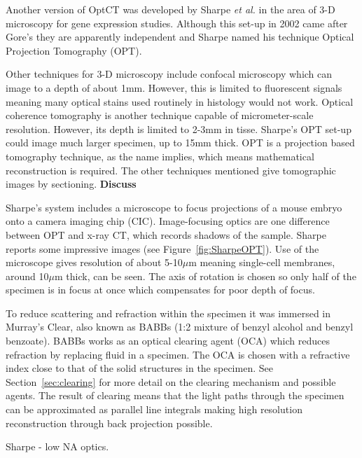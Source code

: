 \documentclass[12pt]{article}
\begin{document}
Another version of OptCT was  developed by Sharpe \textit{et al.} in the area of 3-D microscopy for gene expression studies. \cite{Sharpe:2002jp} Although this set-up in 2002 came after Gore's they are apparently independent and Sharpe named his technique Optical Projection Tomography (OPT).

Other techniques for 3-D microscopy include confocal microscopy which can image to a depth of about 1mm. \cite{Webb:1996} However, this is limited to fluorescent signals meaning many optical stains used routinely in histology would not work. Optical coherence tomography is another technique capable of micrometer-scale resolution. \cite{huang1993optical} However, its depth is limited to 2-3mm in tisse. Sharpe's OPT set-up could image much larger specimen, up to 15mm thick.  \cite{Sharpe:2002jp} OPT is a projection based tomography technique, as the name implies, which means mathematical reconstruction is required. The other techniques mentioned give tomographic images by sectioning. \cite{Sharpe:2003cm} \textbf{Discuss}

Sharpe's system includes a microscope to focus projections of a mouse embryo onto a camera imaging chip (CIC). Image-focusing optics are one difference between OPT and x-ray CT, which records shadows of the sample. Sharpe reports some impressive images (see Figure~\ref{fig:SharpeOPT}). Use of the microscope gives resolution of about 5-10$\mu$m meaning single-cell membranes, around 10$\mu$m thick, can be seen.\cite{Sharpe:2002jp} The axis of rotation is chosen so only half of the specimen is in focus at once which compensates for poor depth of focus. 

To reduce scattering and refraction within the specimen it was immersed in Murray's Clear, also known as BABBs (1:2 mixture of benzyl alcohol and benzyl benzoate). BABBs works as an optical clearing agent (OCA) which reduces refraction by replacing fluid in a specimen. The OCA is chosen with a refractive index close to that of the solid structures in the specimen. See Section~\ref{sec:clearing} for more detail on the clearing mechanism and possible agents. 
The result of clearing means that the light paths through the specimen can be approximated as parallel line integrals  making high resolution reconstruction through back projection possible.

Sharpe - low NA optics.
\end{document}
